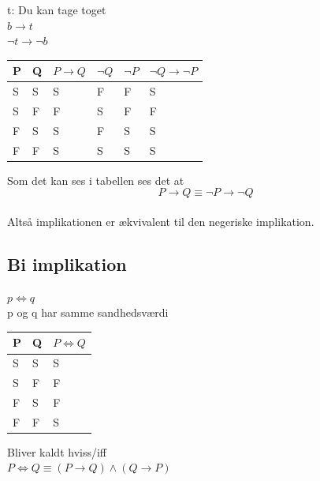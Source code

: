 \documentclass[12pt, a4paper]{article}
\begin{document}
					t: Du kan tage toget\\
					$b\rightarrow t$\\
					$\neg t \rightarrow \neg b$\\
					\begin{table}[h!]
					\begin{tabular}{|l|l|l|l|l|l|}
					\hline
					P & Q & $P\rightarrow Q$ & $\neg Q$ & $\neg P$ & $\neg Q \rightarrow \neg P$ \\ \hline
					S & S & S                          & F                     & F                     & S                                                                   \\ \hline
					S & F & F                          & S                     & F                     & F                                                                   \\ \hline
					F & S & S                          & F                     & S                     & S                                                                   \\ \hline
					F & F & S                          & S                     & S                     & S                                                                   \\ \hline
					\end{tabular}
					\end{table}
				Som det kan ses i tabellen ses det at $$P\rightarrow Q \equiv \neg P \rightarrow \neg Q$$\\
				Altså implikationen er ækvivalent til den negeriske implikation.
			\subsection{Bi implikation}
				$p\iff q$\\
				p og q har samme sandhedsværdi\\
				\begin{table}[h!]
				\begin{tabular}{|l|l|l|}
				\hline
				P & Q & $P\iff Q$ \\ \hline
				S & S & S                                 \\ \hline
				S & F & F                                 \\ \hline
				F & S & F                                 \\ \hline
				F & F & S                                 \\ \hline
				\end{tabular}
				\end{table}
				Bliver kaldt hviss/iff\\
				$P\iff Q \equiv (P\rightarrow Q) \land (Q\rightarrow P)$\\
\end{document}
